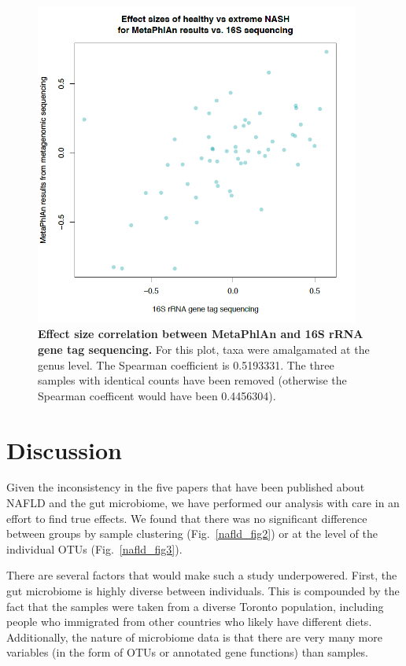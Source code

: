 \begin{figure}[h]
\begin{center}
\includegraphics[width=0.95\textwidth]{metaphlan_16s_effects.png}
\caption{\textbf{Effect size correlation between MetaPhlAn and 16S rRNA gene tag sequencing.} For this plot, taxa were amalgamated at the genus level. The Spearman coefficient is 0.5193331. The three samples with identical counts have been removed (otherwise the Spearman coefficent would have been 0.4456304).}
\end{center}
\label{nafld_metaphlan_effect}
\end{figure}

\section{Discussion}

Given the inconsistency in the five papers that have been published about NAFLD and the gut microbiome, we have performed our analysis with care in an effort to find true effects. We found that there was no significant difference between groups by sample clustering (Fig.~\ref{nafld_fig2}) or at the level of the individual OTUs (Fig.~\ref{nafld_fig3}).

There are several factors that would make such a study underpowered. First, the gut microbiome is highly diverse between individuals. This is compounded by the fact that the samples were taken from a diverse Toronto population, including people who immigrated from other countries who likely have different diets. Additionally, the nature of microbiome data is that there are very many more variables (in the form of OTUs or annotated gene functions) than samples.

